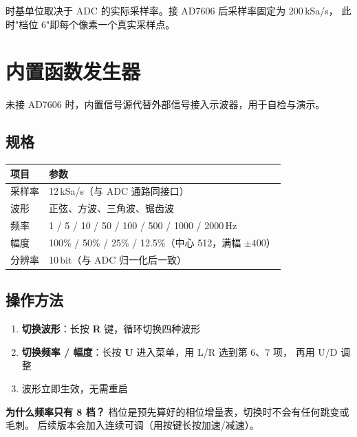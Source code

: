 \documentclass[UTF8,a4paper,11pt]{ctexart}
\begin{document}
\begin{tipbox}
时基单位取决于 ADC 的实际采样率。接 AD7606 后采样率固定为 200\,kSa/s，
此时"档位 6"即每个像素一个真实采样点。
\end{tipbox}

\section{内置函数发生器}

未接 AD7606 时，内置信号源代替外部信号接入示波器，用于自检与演示。

\subsection{规格}

\begin{center}
\small
\begin{tabular}{ll}
\toprule
项目 & 参数\\
\midrule
采样率 & 12\,kSa/s（与 ADC 通路同接口）\\
波形 & 正弦、方波、三角波、锯齿波\\
频率 & 1 / 5 / 10 / 50 / 100 / 500 / 1000 / 2000\,Hz\\
幅度 & 100\% / 50\% / 25\% / 12.5\%（中心 512，满幅 $\pm400$）\\
分辨率 & 10\,bit（与 ADC 归一化后一致）\\
\bottomrule
\end{tabular}
\end{center}

\subsection{操作方法}

\begin{enumerate}[leftmargin=2em]
  \item \textbf{切换波形}：长按 \textbf{R} 键，循环切换四种波形
  \item \textbf{切换频率 / 幅度}：长按 \textbf{U} 进入菜单，用 L/R 选到第 6、7 项，
        再用 U/D 调整
  \item 波形立即生效，无需重启
\end{enumerate}

\begin{tipbox}
\textbf{为什么频率只有 8 档？}
档位是预先算好的相位增量表，切换时不会有任何跳变或毛刺。
后续版本会加入连续可调（用按键长按加速/减速）。
\end{tipbox}
\end{document}
